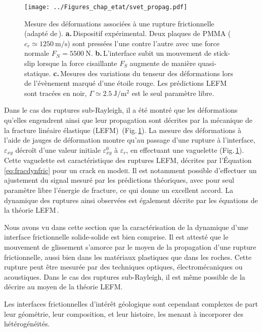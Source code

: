 \begin{figure}[htb]
\centering
\texttt{[image: ../Figures\_chap\_etat/svet\_propag.pdf]}
\caption[Mesure des déformations associées à une rupture frictionnelle]{Mesure des déformations associées à une rupture frictionnelle (adapté de\,\cite{svetlizky_brittle_2019}). \textbf{a.}\,Dispositif expérimental. Deux plaques de PMMA ($c_r \simeq \SI{1250}{\meter\per\second}$) sont pressées l'une contre l'autre avec une force normale $F_N=\SI{5500}{\newton}$. \textbf{b.}\,L'interface subit un mouvement de stick-slip lorsque la force cisaillante $F_S$ augmente de manière quasi-statique. \textbf{c.}\,Mesures des variations du tenseur des déformations lors de l'évènement marqué d'une étoile rouge. Les prédictions LEFM sont tracées en noir, $\Gamma\simeq\SI{2.5}{\joule\per\meter\squared}$ est le seul paramètre libre.}
\label{fig:reflex}
\end{figure}


Dans le cas des ruptures sub-Rayleigh, il a été montré que les déformations qu'elles engendrent ainsi que leur propagation sont décrites par la mécanique de la fracture linéaire élastique (LEFM)\,\cite{kammer_linear_2015,svetlizky_brittle_2019} (Fig.\,\ref{fig:reflex}). La mesure des déformations à l'aide de jauges de déformation montre qu'au passage d'une rupture à l'interface, $\varepsilon_{xy}$ décroît d'une valeur initiale $\varepsilon_{xy}^0$ à $\varepsilon_{r}$, en effectuant une vaguelette (Fig.\,\ref{fig:reflex}). Cette vaguelette est caractéristique des ruptures LEFM, décrites par l'Équation\,\ref{eq:fracdynfric} pour un crack en mode\:\textsc{ii}. Il est notamment possible d'effectuer un ajustement du signal mesuré par les prédictions théoriques, avec pour seul paramètre libre l'énergie de fracture, ce qui donne un excellent accord. La dynamique des ruptures ainsi observées est également décrite par les équations de la théorie LEFM\,\cite{svetlizky_brittle_2017}.



Nous avons vu dans cette section que la caractérisation de la dynamique d'une interface frictionnelle solide-solide est bien comprise. Il est attesté que le mouvement de glissement s'amorce par le moyen de la propagation d'une rupture frictionnelle, aussi bien dans les matériaux plastiques que dans les roches. Cette rupture peut être mesurée par des techniques optiques, électromécaniques ou acoustiques. Dans le cas des ruptures sub-Rayleigh, il est même possible de la décrire au moyen de la théorie LEFM.


Les interfaces frictionnelles d'intérêt géologique sont cependant complexes de part leur géométrie, leur composition, et leur histoire, les menant à incorporer des hétérogénéités.


